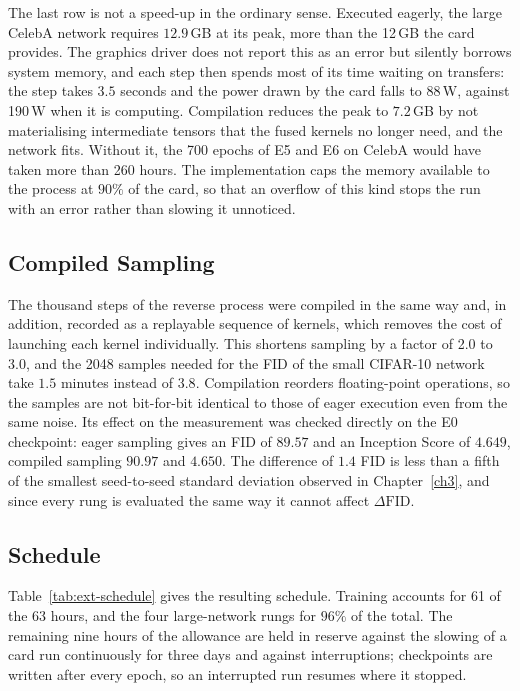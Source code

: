 The last row is not a speed-up in the ordinary sense. Executed eagerly, the large CelebA network
requires $12.9$\,GB at its peak, more than the 12\,GB the card provides. The graphics driver does not
report this as an error but silently borrows system memory, and each step then spends most of its
time waiting on transfers: the step takes $3.5$ seconds and the power drawn by the card falls to 88\,W,
against 190\,W when it is computing. Compilation reduces the peak to $7.2$\,GB by not materialising
intermediate tensors that the fused kernels no longer need, and the network fits. Without it, the
700 epochs of E5 and E6 on CelebA would have taken more than 260 hours. The implementation caps the memory available to
the process at $90\%$ of the card, so that an overflow of this kind stops the run with an error
rather than slowing it unnoticed.

\subsection{Compiled Sampling}

The thousand steps of the reverse process were compiled in the same way and, in addition, recorded
as a replayable sequence of kernels, which removes the cost of launching each kernel individually.
This shortens sampling by a factor of 2.0 to 3.0, and the 2048 samples needed for the FID of the
small CIFAR-10 network take $1.5$ minutes instead of $3.8$. Compilation reorders floating-point
operations, so the samples are not bit-for-bit identical to those of eager execution even from the
same noise. Its effect on the measurement was checked directly on the E0 checkpoint: eager sampling
gives an FID of $89.57$ and an Inception Score of $4.649$, compiled sampling $90.97$ and $4.650$. The
difference of $1.4$ FID is less than a fifth of the smallest seed-to-seed standard deviation observed
in Chapter~\ref{ch3}, and since every rung is evaluated the same way it cannot affect
$\Delta\mathrm{FID}$.

\subsection{Schedule}

Table~\ref{tab:ext-schedule} gives the resulting schedule. Training accounts for 61 of the 63 hours,
and the four large-network rungs for $96\%$ of the total. The remaining nine hours of the allowance
are held in reserve against the slowing of a card run continuously for three days and against
interruptions; checkpoints are written after every epoch, so an interrupted run resumes where it
stopped.

